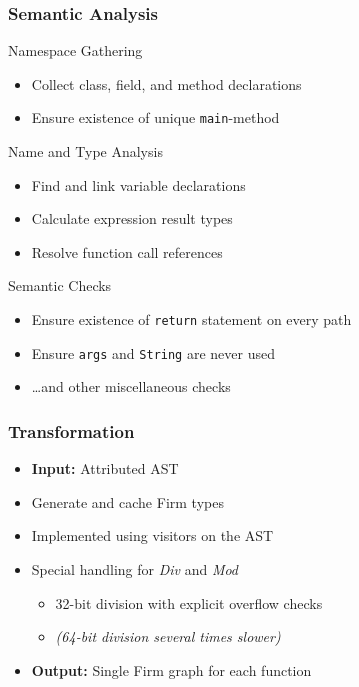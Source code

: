 \documentclass[navbaroff,en]{sdqbeamer}
\begin{document}
\begin{frame}
	\frametitle{Semantic Analysis}

	\begin{contentblock}{Namespace Gathering}
		\begin{itemize}
			\item Collect class, field, and method declarations
			\item Ensure existence of unique \texttt{main}-method
		\end{itemize}
	\end{contentblock}


	\begin{contentblock}{Name and Type Analysis}
		\begin{itemize}
			\item Find and link variable declarations
			\item Calculate expression result types
			\item Resolve function call references
		\end{itemize}
	\end{contentblock}


	\begin{contentblock}{Semantic Checks}
		\begin{itemize}
			\item Ensure existence of \texttt{return} statement on every path
			\item Ensure \texttt{args} and \texttt{String} are never used
			\item \dots and other miscellaneous checks
		\end{itemize}
	\end{contentblock}

\end{frame}

\begin{frame}
	\frametitle{Transformation}

	\begin{itemize}
		\item \textbf{Input:} Attributed AST
		\item Generate and cache Firm types
		\item Implemented using visitors on the AST

		\vspace{1em}

		\item Special handling for \textit{Div} and \textit{Mod}
		\begin{itemize}
			\item 32-bit division with explicit overflow checks
			\item \textit{(64-bit division several times slower)}
		\end{itemize}

		\vspace{1em}

		\item \textbf{Output:} Single Firm graph for each function
	\end{itemize}

\end{frame}
\end{document}
